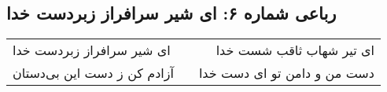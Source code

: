 \begin{center}
\section*{رباعی شماره ۶: ای شیر سرافراز زبردست خدا}
\label{sec:sh006}
\begin{longtable}{l p{0.5cm} r}
ای شیر سرافراز زبردست خدا
&&
ای تیر شهاب ثاقب شست خدا
\\
آزادم کن ز دست این بی‌دستان
&&
دست من و دامن تو ای دست خدا
\\
\end{longtable}
\end{center}
